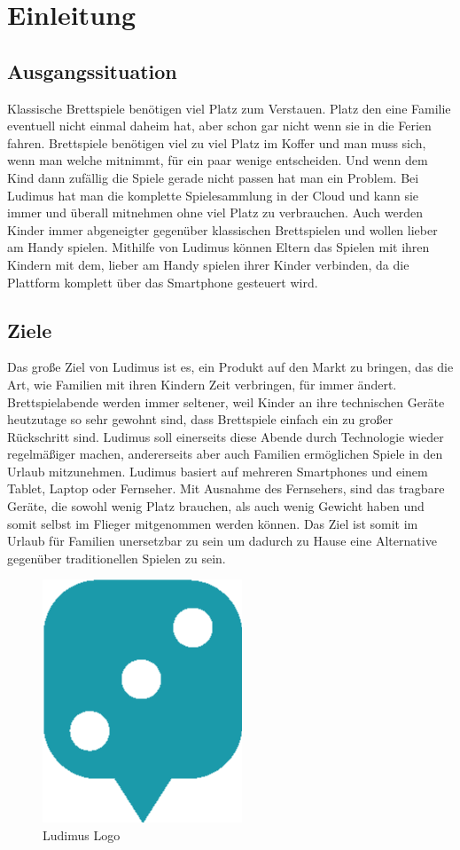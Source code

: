 \chapter{Einleitung}
\section{Ausgangssituation}
Klassische Brettspiele benötigen viel Platz zum Verstauen. Platz den eine Familie eventuell nicht einmal daheim hat, aber schon gar nicht wenn sie in die Ferien fahren. Brettspiele benötigen viel zu viel Platz im Koffer und man muss sich, wenn man welche mitnimmt, für ein paar wenige entscheiden. Und wenn dem Kind dann zufällig die Spiele gerade nicht passen hat man ein Problem. Bei Ludimus hat man die komplette Spielesammlung in der Cloud und kann sie immer und überall mitnehmen ohne viel Platz zu verbrauchen.
\newline 
Auch werden Kinder immer abgeneigter gegenüber klassischen Brettspielen und wollen lieber am Handy spielen. Mithilfe von Ludimus können Eltern das Spielen mit ihren Kindern mit dem, lieber am Handy spielen ihrer Kinder verbinden, da die Plattform komplett über das Smartphone gesteuert wird.

\section{Ziele}
Das große Ziel von Ludimus ist es, ein Produkt auf den Markt zu bringen, das die Art, wie Familien mit ihren Kindern Zeit verbringen, für immer ändert. Brettspielabende werden immer seltener, weil Kinder an ihre technischen Geräte heutzutage so sehr gewohnt sind, dass Brettspiele einfach ein zu großer Rückschritt sind. Ludimus soll einerseits diese Abende durch Technologie wieder regelmäßiger machen, andererseits aber auch Familien ermöglichen Spiele in den Urlaub mitzunehmen. Ludimus basiert auf mehreren Smartphones und einem Tablet, Laptop oder Fernseher. Mit Ausnahme des Fernsehers, sind das tragbare Geräte, die sowohl wenig Platz brauchen, als auch wenig Gewicht haben und somit selbst im Flieger mitgenommen werden können. 
Das Ziel ist somit im Urlaub für Familien unersetzbar zu sein um dadurch zu Hause eine Alternative gegenüber traditionellen Spielen zu sein.

\begin{figure}
\begin{center}
	\includegraphics[scale=0.3]{images/ludimusLogo.png}
\end{center}
	\caption{Ludimus Logo}
\end{figure}

